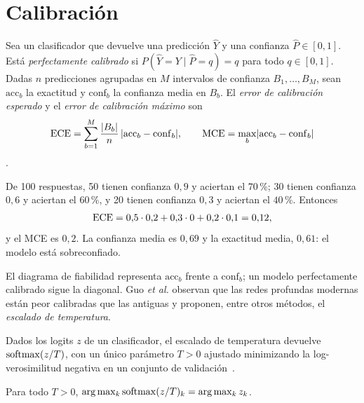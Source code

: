 \section{Calibración}

\begin{definicion}\label{def:ece}
Sea un clasificador que devuelve una predicción $\hat Y$ y una confianza $\hat P\in[0,1]$. Está \emph{perfectamente calibrado} si $P(\hat Y=Y\mid\hat P=q)=q$ para todo $q\in[0,1]$. Dadas $n$ predicciones agrupadas en $M$ intervalos de confianza $B_1,\dots,B_M$, sean $\mathrm{acc}_b$ la exactitud y $\mathrm{conf}_b$ la confianza media en $B_b$. El \emph{error de calibración esperado} y el \emph{error de calibración máximo} son
\[
\operatorname{ECE}=\sum_{b=1}^{M}\frac{\lvert B_b\rvert}{n}\,\lvert\mathrm{acc}_b-\mathrm{conf}_b\rvert,\qquad \operatorname{MCE}=\max_b\lvert\mathrm{acc}_b-\mathrm{conf}_b\rvert
\]
\cite[§2, ecs.~(1), (3) y~(5)]{guo}.
\end{definicion}

\begin{ejemplo}\label{ej:ece}
De 100 respuestas, 50 tienen confianza $0{,}9$ y aciertan el $70\,\%$; 30 tienen confianza $0{,}6$ y aciertan el $60\,\%$, y 20 tienen confianza $0{,}3$ y aciertan el $40\,\%$. Entonces
\[
\operatorname{ECE}=0{,}5\cdot 0{,}2+0{,}3\cdot 0+0{,}2\cdot 0{,}1=0{,}12,
\]
y el MCE es $0{,}2$. La confianza media es $0{,}69$ y la exactitud media, $0{,}61$: el modelo está sobreconfiado.
\end{ejemplo}

El diagrama de fiabilidad representa $\mathrm{acc}_b$ frente a $\mathrm{conf}_b$; un modelo perfectamente calibrado sigue la diagonal. Guo \emph{et al.} observan que las redes profundas modernas están peor calibradas que las antiguas y proponen, entre otros métodos, el \emph{escalado de temperatura}.

\begin{definicion}\label{def:temp}
Dados los logits $z$ de un clasificador, el escalado de temperatura devuelve $\operatorname{softmax}(z/T)$, con un único parámetro $T>0$ ajustado minimizando la log-verosimilitud negativa en un conjunto de validación~\cite[§4]{guo}.
\end{definicion}

\begin{proposicion}\label{prop:temp}
Para todo $T>0$, $\arg\max_k\operatorname{softmax}(z/T)_k=\arg\max_kz_k$.
\end{proposicion}

